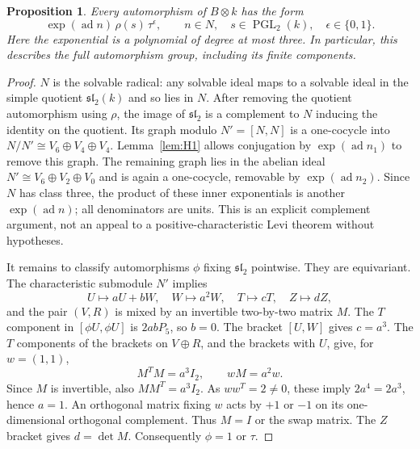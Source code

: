 \documentclass[11pt]{article}
\newtheorem{proposition}[theorem]{Proposition}
\theoremstyle{definition}\newtheorem{definition}[theorem]{Definition}
\theoremstyle{remark}\newtheorem{remark}[theorem]{Remark}
\DeclareMathOperator{\ad}{ad}
\DeclareMathOperator{\PGL}{PGL}
\begin{document}
\begin{proposition}\label{prop:autB}
Every automorphism of $B\otimes k$ has the form
\begin{equation}\label{eq:autB}
 \exp(\ad n)\,\rho(s)\,\tau^\epsilon,
 \qquad n\in N,\quad s\in\PGL_2(k),\quad \epsilon\in\{0,1\}.
\end{equation}
Here the exponential is a polynomial of degree at most three. In particular,
this describes the full automorphism group, including its finite components.
\end{proposition}
\begin{proof}
$N$ is the solvable radical: any solvable ideal maps to a solvable ideal in
the simple quotient $\mathfrak{sl}_2(k)$ and so lies in $N$.
After removing the quotient automorphism using $\rho$, the image of
$\mathfrak{sl}_2$ is a complement to $N$ inducing the identity on the quotient.
Its graph modulo $N'=[N,N]$ is a one-cocycle into
$N/N'\cong V_6\oplus V_4\oplus V_4$.
Lemma~\ref{lem:H1} allows conjugation by $\exp(\ad n_1)$ to remove this
graph. The remaining graph lies in the abelian ideal
$N'\cong V_6\oplus V_2\oplus V_0$ and is again a one-cocycle, removable by
$\exp(\ad n_2)$. Since $N$ has class three, the product of these inner
exponentials is another $\exp(\ad n)$; all denominators are units.
This is an explicit complement argument, not an appeal to a
positive-characteristic Levi theorem without hypotheses.

It remains to classify automorphisms $\phi$ fixing $\mathfrak{sl}_2$ pointwise.
They are equivariant. The characteristic submodule $N'$ implies
\[
 U\mapsto aU+bW,\quad W\mapsto a^2W,\quad T\mapsto cT,
 \quad Z\mapsto dZ,
\]
and the pair $(V,R)$ is mixed by an invertible two-by-two matrix $M$.
The $T$ component in $[\phi U,\phi U]$ is $2abP_5$, so $b=0$.
The bracket $[U,W]$ gives $c=a^3$. The $T$ components of the brackets on
$V\oplus R$, and the brackets with $U$, give, for $w=(1,1)$,
\begin{equation}\label{eq:block}
 M^T M=a^3 I_2,\qquad wM=a^2w.
\end{equation}
Since $M$ is invertible, also $MM^T=a^3I_2$. As $ww^T=2\ne0$,
these imply $2a^4=2a^3$, hence $a=1$.
An orthogonal matrix fixing $w$ acts by $+1$ or $-1$ on its one-dimensional
orthogonal complement. Thus $M=I$ or the swap matrix. The $Z$ bracket gives
$d=\det M$. Consequently $\phi=1$ or $\tau$.
\end{proof}
\end{document}
